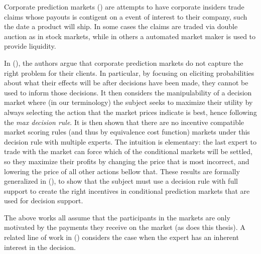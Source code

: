Corporate prediction markets (\cite{ortner1998forecasting,cowgill2015corporate})  are attempts to have corporate insiders trade claims whose payouts is contigent on a event of interest to their company, such the date a product will ship. In some cases the claims are traded via double auction as in stock markets, while in others a automated market maker is used to provide liquidity. 

In (\cite{othman2010decision}), the authors argue that corporate prediction markets do not capture the right problem for their clients. In particular, by focusing on eliciting probabilities about what their effects will be after decisions have been made, they cannot be used to inform those decisions. It then considers the manipulability of a decision market where (in our terminology) the subject seeks to maximize their utility by always selecting the action that the market prices indicate is best, hence following the \emph{max decision rule}. It is then shown that there are no incentive compatible market scoring rules (and thus by equivalence cost function) markets under this decision rule with multiple experts. %
The intuition is elementary: the last expert to trade with the market can force which of the conditional markets will be settled, so they maximize their profits by changing the price that is most incorrect, and lowering the price of all other actions bellow that.
These results are formally generalized in (\cite{chen2014eliciting}), to show that the subject must use a decision rule with full support to create the right incentives in conditional prediction markets that are used for decision support.

The above works all assume that the participants in the markets are only motivated by the payments they receive on the market (as does this thesis). A related line of work in (\cite{boutilier2012eliciting}) considers the case when the expert has an inherent interest in the decision. 

